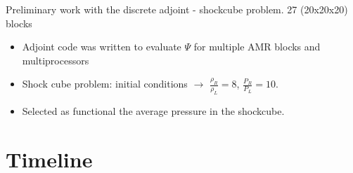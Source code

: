 \documentclass{beamer}
\begin{document}
\begin{frame}
\begin{minipage}[t][1\textheight]{1\textwidth}
\begin{exampleblock}{Preliminary work with the discrete adjoint - shockcube problem. 27 (20x20x20) blocks}
\begin{figure}
\end{figure}
\vspace{-10pt}
\begin{itemize}
\scriptsize

\item Adjoint code was written to evaluate $\Psi$ for multiple AMR blocks and multiprocessors
\item Shock cube problem: initial conditions $\rightarrow$ $\frac{\rho_R}{\rho_L} = 8$, $\frac{P_R}{P_L} = 10$. 
\item Selected as functional the average pressure in the shockcube.

\end{itemize}

\end{exampleblock}
\end{minipage}

\end{frame}


\section[Timeline]{Timeline}
\end{document}
